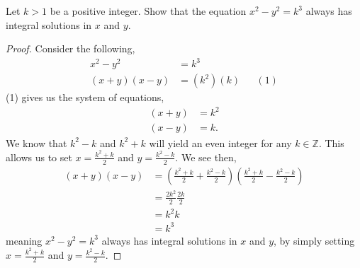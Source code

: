 \documentclass[11pt]{article}
\newenvironment{problem}[2][Problem\!]{\begin{trivlist}
\item[\hskip \labelsep {\bfseries #1}\hskip \labelsep {\bfseries #2}]}{\end{trivlist}}
\newcommand{\zz}{\mathbb Z}   %
\begin{document}
\newpage
\begin{tcolorbox}
  \begin{problem} {IC | 12-03 | PP 42}
    Let $k > 1$ be a positive integer. Show that the equation $x^{2} -y^{2} = k^{3}$
always has integral solutions in $x$ and $y$.
  \end{problem}
\end{tcolorbox}
\begin{proof}
    Consider the following,
    \begin{align*}
        x^{2} - y^{2} &= k^{3} \\
        (x+y)(x-y) &= (k^{2})(k) && (1)
    \end{align*}
    (1) gives us the system of equations,
    \begin{align*}
        (x+y) &= k^{2} \\
        (x-y) &= k.
    \end{align*}
    We know that $k^{2} - k$ and $k^{2} +k $ will yield an even integer for any $k \in \zz$. This allows us to set $x = \frac{k^{2} + k}{2}$ and $y = \frac{k^{2} - k}{2}$. We see then,
    \begin{align*}
        (x+y)(x-y) &= (\frac{k^{2} + k}{2} + \frac{k^{2} - k}{2})(\frac{k^{2} + k}{2} -\frac{k^{2} - k}{2}) \\
        &= \frac{2k^{2}}{2}\frac{2k}{2} \\
        &= k^{2}k\\
        &= k^{3}
    \end{align*}
    meaning $x^{2}-y^{2} = k^{3}$ always has integral solutions in $x$ and $y$, by simply setting $x = \frac{k^{2} + k}{2}$ and $y = \frac{k^{2} - k}{2}$.
\end{proof}
\end{document}
